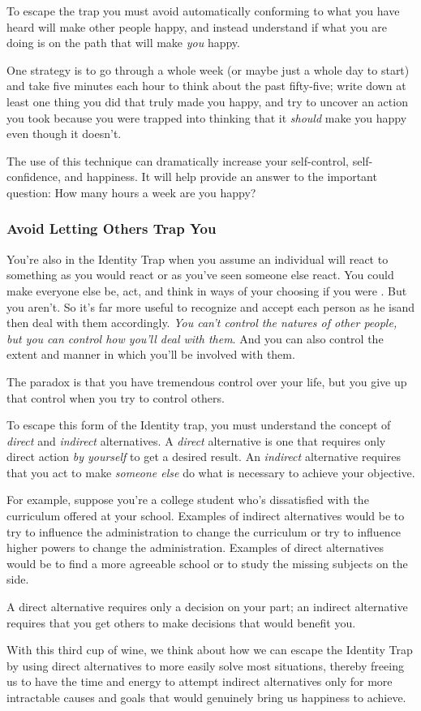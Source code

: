 {  \newReading To escape the trap you must avoid automatically conforming to what
  you have heard will make other people happy, and instead understand if what
  you are doing is on the path that will make \textit{you} happy.

  One strategy is to go through a whole week (or maybe just a whole day to
  start) and take five minutes each hour to think about the past fifty-five;
  write down at least one thing you did that truly made you happy, and try to
  uncover an action you took because you were trapped into thinking that it
  \textit{should} make you happy even though it doesn't.

  The use of this technique can dramatically increase your self-control,
  self-confidence, and happiness. It will help provide an answer to the
  important question:
How many hours a week are you happy?

  \subsubsection*{Avoid Letting Others Trap You}
  \newReading You're also in the Identity Trap when you assume an individual
  will react to something as you would react or as you've seen someone else
  react. You could make everyone else be, act, and think in ways of your
  choosing if you were \god{}. But you aren't. So it's far more useful to
  recognize and accept each person as he is\textemdash{}and then deal with them
  accordingly. \textit{You can't control the natures of other people, but you
  can control how you'll deal with them}. And you can also control the extent
  and manner in which you'll be involved with them.

  The paradox is that you have tremendous control over your life, but you give
  up that control when you try to control others.

  To escape this form of the Identity trap, you must understand the concept of
  \textit{direct} and \textit{indirect} alternatives. A \textit{direct}
  alternative is one that requires only direct action \textit{by yourself} to
  get a desired result. An \textit{indirect} alternative requires that you act
  to make \textit{someone else} do what is necessary to achieve your objective.

  \newReading For example, suppose you're a college student who's dissatisfied
  with the curriculum offered at your school. Examples of indirect alternatives
  would be to try to influence the administration to change the curriculum or
  try to influence higher powers to change the administration. Examples of
  direct alternatives would be to find a more agreeable school or to study the
  missing subjects on the side.

  A direct alternative requires only a decision on your part; an indirect
  alternative requires that you get others to make decisions that would benefit
  you.

  With this third cup of wine, we think about how we can escape the Identity
  Trap by using direct alternatives to more easily solve most situations,
  thereby freeing us to have the time and energy to attempt indirect
  alternatives only for more intractable causes and goals that would genuinely
  bring us happiness to achieve.
}

